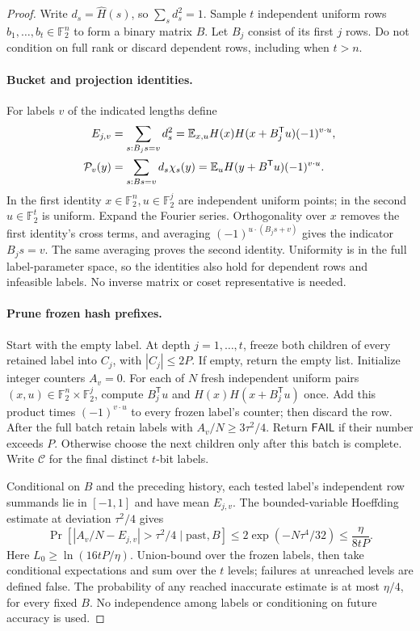 \documentclass[11pt]{article}
\theoremstyle{remark}\newtheorem{remark}[theorem]{Remark}
\newcommand{\F}{\mathbb F}
\newcommand{\E}{\mathbb E}
\newcommand{\FAIL}{\mathsf{FAIL}}
\begin{document}
\begin{proof}
Write $d_s=\widehat H(s)$, so $\sum_s d_s^2=1$. Sample $t$ independent uniform rows $b_1,\ldots,b_t\in\F_2^n$ to form a binary matrix $B$. Let $B_j$ consist of its first $j$ rows. Do not condition on full rank or discard dependent rows, including when $t>n$.

\paragraph{Bucket and projection identities.}
For labels $v$ of the indicated lengths define
\begin{align}\label{eq:bucket}
 E_{j,v}&=\sum_{s:B_js=v}d_s^2
 =\E_{x,u}H(x)H(x+B_j^{\mathsf T}u)(-1)^{v\cdot u},\notag\\
 \mathcal P_v(y)&=\sum_{s:Bs=v}d_s\chi_s(y)
 =\E_u H(y+B^{\mathsf T}u)(-1)^{v\cdot u}.
\end{align}
In the first identity $x\in\F_2^n,u\in\F_2^j$ are independent uniform points; in the second $u\in\F_2^t$ is uniform. Expand the Fourier series. Orthogonality over $x$ removes the first identity's cross terms, and averaging $(-1)^{u\cdot(B_js+v)}$ gives the indicator $B_js=v$. The same averaging proves the second identity. Uniformity is in the full label-parameter space, so the identities also hold for dependent rows and infeasible labels. No inverse matrix or coset representative is needed.

\paragraph{Prune frozen hash prefixes.}
Start with the empty label. At depth $j=1,\ldots,t$, freeze both children of every retained label into $C_j$, with $|C_j|\le2P$. If empty, return the empty list. Initialize integer counters $A_v=0$. For each of $N$ fresh independent uniform pairs $(x,u)\in\F_2^n\times\F_2^j$, compute $B_j^{\mathsf T}u$ and $H(x)H(x+B_j^{\mathsf T}u)$ once. Add this product times $(-1)^{v\cdot u}$ to every frozen label's counter; then discard the row. After the full batch retain labels with $A_v/N\ge3\tau^2/4$. Return $\FAIL$ if their number exceeds $P$. Otherwise choose the next children only after this batch is complete. Write $\mathcal C$ for the final distinct $t$-bit labels.

Conditional on $B$ and the preceding history, each tested label's independent row summands lie in $[-1,1]$ and have mean $E_{j,v}$. The bounded-variable Hoeffding estimate at deviation $\tau^2/4$ gives
\[
 \Pr[|A_v/N-E_{j,v}|>\tau^2/4\mid\text{past},B]
 \le2\exp(-N\tau^4/32)\le\frac{\eta}{8tP}.
\]
Here $L_0\ge\ln(16tP/\eta)$. Union-bound over the frozen labels, then take conditional expectations and sum over the $t$ levels; failures at unreached levels are defined false. The probability of any reached inaccurate estimate is at most $\eta/4$, for every fixed $B$. No independence among labels or conditioning on future accuracy is used.


\end{proof}
\end{document}
